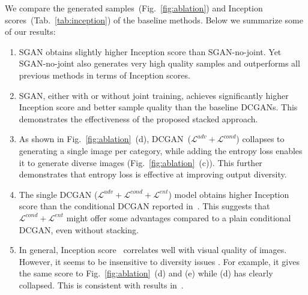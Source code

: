 \documentclass[10pt,twocolumn,letterpaper]{article}
\begin{document}
We compare the generated samples~(Fig.~\ref{fig:ablation}) and Inception scores~(Tab.~\ref{tab:inception}) of the baseline methods. Below we summarize some of our results:
\begin{enumerate}[1)]
\item SGAN obtains slightly higher Inception score than SGAN-no-joint. %
Yet SGAN-no-joint also generates very high quality samples and outperforms all previous methods in terms of Inception scores. 
\item SGAN, either with or without joint training, achieves significantly higher Inception score and better sample quality than the baseline DCGANs. This demonstrates the effectiveness of the proposed stacked approach.
\item As shown in Fig.~\ref{fig:ablation}~(d), DCGAN~($\mathcal{L}^{adv}+\mathcal{L}^{cond}$) collapses to generating a single image per category, while adding the entropy loss enables it to generate diverse images (Fig.~\ref{fig:ablation}~(c)). This further demonstrates that entropy loss is effective at improving output diversity.
\item The single DCGAN ($\mathcal{L}^{adv}+\mathcal{L}^{cond}+\mathcal{L}^{ent}$) model obtains higher Inception score than the conditional DCGAN reported in~\cite{wang2017learning}. This suggests that $\mathcal{L}^{cond}+\mathcal{L}^{ent}$ might offer some advantages compared to a plain conditional DCGAN, even without stacking.
\item In general, Inception score~\cite{salimans2016improved} correlates well with visual quality of images. However, it seems to be insensitive to diversity issues							. For example, it gives the same score to Fig.~\ref{fig:ablation}~(d) and (e) while (d) has clearly collapsed. This is consistent with results in~\cite{odena2017conditional,wang2017learning}.
\end{enumerate}
\end{document}

